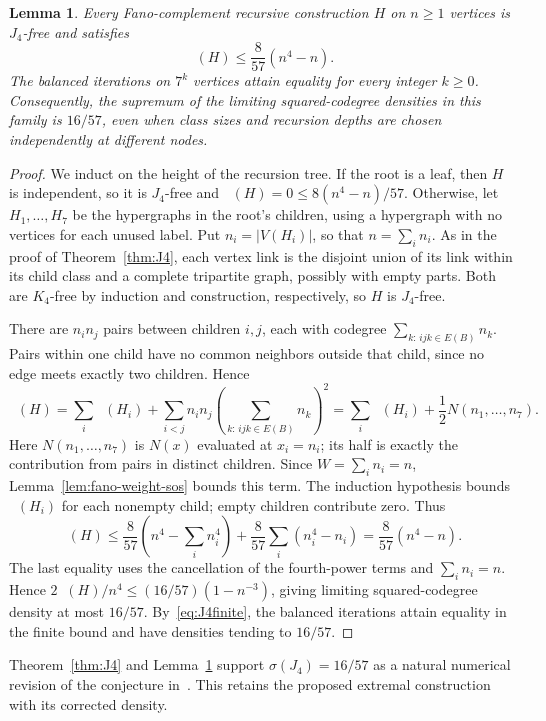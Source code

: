 \documentclass[11pt]{article}
\newtheorem{lemma}[theorem]{Lemma}
\theoremstyle{remark}
\numberwithin{equation}{section}
\DeclareMathOperator{\co}{co_2}
\begin{document}
\begin{lemma}\label{lem:fano-tree}
Every Fano-complement recursive construction $H$ on $n\ge1$ vertices is
$J_4$-free and satisfies
\[
 \co(H)\le\frac8{57}(n^4-n).
\]
The balanced iterations on $7^k$ vertices attain equality for every
integer $k\ge0$. Consequently, the supremum of the limiting
squared-codegree densities in this family is $16/57$, even when class
sizes and recursion depths are chosen independently at different nodes.
\end{lemma}

\begin{proof}
We induct on the height of the recursion tree.
If the root is a leaf, then $H$ is independent, so it is
$J_4$-free and $\co(H)=0\le8(n^4-n)/57$.
Otherwise, let $H_1,\ldots,H_7$ be the hypergraphs in the root's
children, using a hypergraph with no vertices for each unused label. Put
$n_i=|V(H_i)|$, so that $n=\sum_i n_i$.
As in the proof of Theorem~\ref{thm:J4}, each vertex link is the
disjoint union of its link within its child class and a complete
tripartite graph, possibly with empty parts. Both are $K_4$-free by
induction and construction, respectively, so $H$ is $J_4$-free.

There are $n_in_j$ pairs between children $i,j$,
each with codegree $\sum_{k:\,ijk\in E(B)}n_k$.
Pairs within one child have no common neighbors outside that child,
since no edge meets exactly two children. Hence
\[
 \co(H)=\sum_i\co(H_i)
   +\sum_{i<j}n_in_j\left(\sum_{k:\,ijk\in E(B)}n_k\right)^2
 =\sum_i\co(H_i)+\frac12N(n_1,\ldots,n_7).
\]
Here $N(n_1,\ldots,n_7)$ is $N(x)$ evaluated at $x_i=n_i$;
its half is exactly the contribution from pairs in distinct children.
Since $W=\sum_i n_i=n$, Lemma~\ref{lem:fano-weight-sos} bounds this
term. The induction hypothesis bounds
$\co(H_i)$ for each nonempty child; empty children contribute zero.
Thus
\[
 \co(H)\le\frac8{57}\left(n^4-\sum_i n_i^4\right)
            +\frac8{57}\sum_i(n_i^4-n_i)
          =\frac8{57}(n^4-n).
\]
The last equality uses the cancellation of the fourth-power terms
and $\sum_i n_i=n$. Hence
$2\co(H)/n^4\le(16/57)(1-n^{-3})$, giving limiting
squared-codegree density at most $16/57$.
By~\eqref{eq:J4finite}, the balanced iterations attain equality in
the finite bound and have densities tending to $16/57$.
\end{proof}

Theorem~\ref{thm:J4} and Lemma~\ref{lem:fano-tree} support
$\sigma(J_4)=16/57$ as a natural numerical revision of the conjecture
in~\cite[Conjecture~3.4]{BCL}. This retains the proposed extremal
construction with its corrected density. 
\end{document}
